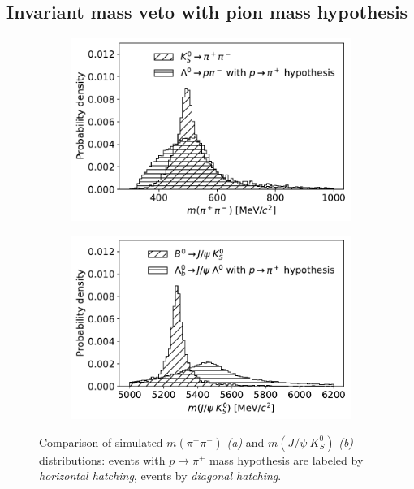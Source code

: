 \subsection{Invariant mass veto with pion mass hypothesis}
\label{sec:B0_veto}

\begin{figure}[t]
	\centering
	\begin{subfigure}{.45\textwidth}
		\includegraphics[width=\textwidth]{graphics/04-event_selection/phys_bkg_ks_comparison.pdf}
		\caption{}
		\label{fig:4:phys_bkg_ks}
	\end{subfigure}
	\begin{subfigure}{.45\textwidth}
		\includegraphics[width=\textwidth]{graphics/04-event_selection/phys_bkg_b0_comparison.pdf}
		\caption{}
		\label{fig:4:phys_bkg_b0}
	\end{subfigure}
	\caption{Comparison of simulated $m(\pi^+\pi^-)$ \textit{(a)} and $m(J/\psi~K^0_S)$ \textit{(b)} distributions: \demonstratorshort events with $p\rightarrow \pi^+$ mass hypothesis are labeled by \textit{horizontal hatching}, \physbkgshort events by \textit{diagonal hatching}.}
	\label{fig:4:phys_bkg_distributions}
\end{figure}

